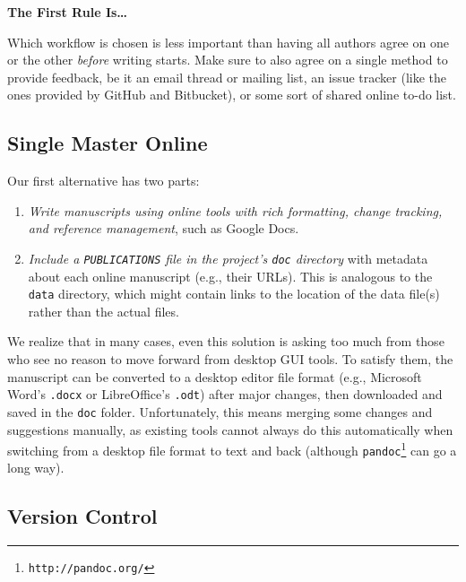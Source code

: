 \documentclass[10pt]{article}
\newcommand{\recommend}[1]{\textit{#1}}
\newcommand{\withurl}[2]{{#1}\footnote{\texttt{#2}}}
\begin{document}
\begin{framed}
\noindent \textbf{The First Rule Is{\ldots}}

Which workflow is chosen is less important than having all authors agree
on one or the other \emph{before} writing starts. Make sure to also
agree on a single method to provide feedback, be it an email thread or
mailing list, an issue tracker (like the ones provided by GitHub and
Bitbucket), or some sort of shared online to-do list.
\end{framed}

\subsection*{Single Master Online}

Our first alternative has two parts:

\begin{enumerate}

\item
  \recommend{Write manuscripts using online tools with rich
    formatting, change tracking, and reference management}, such as
  Google Docs.

\item
  \recommend{Include a \texttt{PUBLICATIONS} file in the project's
    \texttt{doc} directory} with metadata about each online manuscript
  (e.g., their URLs). This is analogous to the \texttt{data}
  directory, which might contain links to the location of the data
  file(s) rather than the actual files.

\end{enumerate}

We realize that in many cases, even this solution is asking too much
from those who see no reason to move forward from desktop GUI tools. To
satisfy them, the manuscript can be converted to a desktop editor file
format (e.g., Microsoft Word's \texttt{.docx} or LibreOffice's
\texttt{.odt}) after major changes, then downloaded and saved in the
\texttt{doc} folder. Unfortunately, this means merging some changes and
suggestions manually, as existing tools cannot always do this
automatically when switching from a desktop file format to text and back
(although \withurl{\texttt{pandoc}}{http://pandoc.org/} can go a long way).

\subsection*{Version Control}
\end{document}

